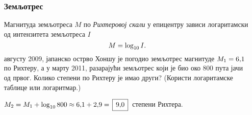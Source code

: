\subsubsection{Земљотрес}

\zadatak Магнитуда земљотреса $M$ по {\sl Рихтеровој скали\/} у епицентру зависи логаритамски од 
интензитета земљотреса $I$
$$
M=\log_{10} I.
$$
\У августу 2009, јапанско острво Хоншу
је погодио земљотрес магнитуде $M_1=6\.1$ по Рихтеру, а у марту 2011,
разарајући земљотрес који је био око 800 пута јачи од првог.
Колико степени по Рихтеру је имао други?
(Користи логаритамске таблице или логаритмар.)

\resenje $M_2 = M_1 + \logten 800 \approx 6\.1 + 2\.9 = \ram{9\.0}$ степени Рихтера. 
